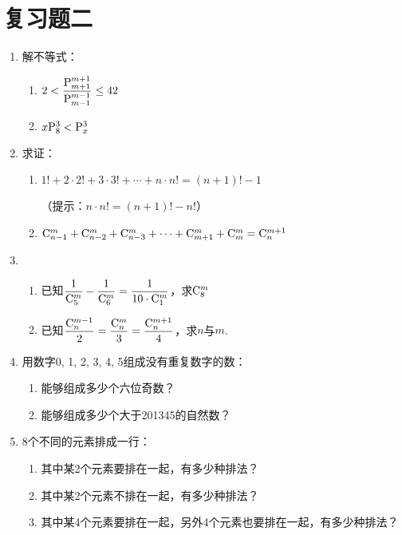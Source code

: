 \section*{复习题二}
\begin{enumerate}
    \item 解不等式：
\begin{multicols}{2}
\begin{enumerate}[(1)]
    \item $2<\dfrac{{\rm P}^{m+1}_{m+1}}{{\rm P}^{m-1}_{m-1}}\le 42$
    \item $x{\rm P}^{3}_{8}<{\rm P}^{3}_{x}$
\end{enumerate}
\end{multicols}

\item 求证：
\begin{enumerate}[(1)]
    \item $1!+2\cdot 2!+3\cdot 3!+\cdots+n\cdot n!=(n+1)!-1$
    
    （提示：$n\cdot n!=(n+1)!-n!$）

\item ${\rm C}^{m}_{n-1}+{\rm C}^{m}_{n-2}+{\rm C}^{m}_{n-3}+\cdots+{\rm C}^{m}_{m+1}+{\rm C}^{m}_{m}={\rm C}^{m+1}_{n}$
\end{enumerate}

\item \begin{enumerate}[(1)]
    \item 已知$\dfrac{1}{{\rm C}^{m}_{5}}-\dfrac{1}{{\rm C}^{m}_{6}}=\dfrac{1}{10\cdot{\rm C}^{m}_{1}}$，求${\rm C}^{m}_{8}$
    \item 已知$\dfrac{{\rm C}^{m-1}_{n}}{2}=\dfrac{{\rm C}^{m}_{n}}{3}=\dfrac{{\rm C}^{m+1}_{n}}{4}$，求$n$与$m$.
\end{enumerate}

\item 用数字0, 1, 2, 3, 4, 5组成没有重复数字的数：
\begin{enumerate}[(1)]
\item 能够组成多少个六位奇数？
\item 能够组成多少个大于201345的自然数？ 
\end{enumerate}

\item 8个不同的元素排成一行：
\begin{enumerate}[(1)]
 \item 其中某2个元素要排在一起，有多少种排法？
\item 其中某2个元素不排在一起，有多少种排法？
\item 其中某4个元素要排在一起，另外4个元素也要排在一起，有多少种排法？  
\end{enumerate}


\end{enumerate}
